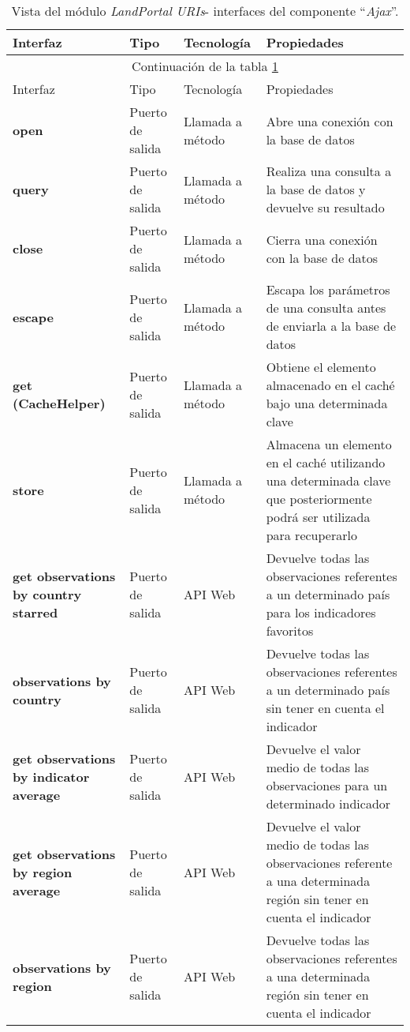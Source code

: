 \begin{longtable}[c]{|p{25mm}|p{20mm}|p{30mm}|p{60mm}|}
	\caption{Vista del módulo \textit{LandPortal URIs}- interfaces del componente ``\textit{Ajax}''. \label{interfaces_landportal_ajax}}\\
		\hline
			Interfaz & Tipo & Tecnología & Propiedades\\
		\hline
		\hline
	\endfirsthead
		\hline
		\multicolumn{4}{|c|}{Continuación de la tabla \ref{interfaces_landportal_ajax}}\\
		\hline
			Interfaz & Tipo & Tecnología & Propiedades\\
		\hline
		\hline
	\endhead
	\hline
	\endfoot
		\textbf{open} & Puerto de salida & Llamada a método & Abre una conexión con la base de datos \\
		\hline
		\textbf{query} & Puerto de salida & Llamada a método & Realiza una consulta a la base de datos y devuelve su resultado \\
		\hline
		\textbf{close} & Puerto de salida & Llamada a método & Cierra una conexión con la base de datos \\
		\hline
		\textbf{escape} & Puerto de salida & Llamada a método & Escapa los parámetros de una consulta antes de enviarla a la base de datos \\
		\hline
		\textbf{get (CacheHelper)} & Puerto de salida & Llamada a método & Obtiene el elemento almacenado en el caché bajo una determinada clave \\
		\hline
		\textbf{store} & Puerto de salida & Llamada a método & Almacena un elemento en el caché utilizando una determinada clave que posteriormente podrá ser utilizada para recuperarlo \\
		\hline
		\textbf{get observations by country starred} & Puerto de salida & API Web & Devuelve todas las observaciones referentes a un determinado país para los indicadores favoritos \\
		\hline
		\textbf{observations by country} & Puerto de salida & API Web & Devuelve todas las observaciones referentes a un determinado país sin tener en cuenta el indicador \\
		\hline
		\textbf{get observations by indicator average} & Puerto de salida & API Web & Devuelve el valor medio de todas las observaciones para un determinado indicador \\
		\hline
		\textbf{get observations by region average} & Puerto de salida & API Web & Devuelve el valor medio de todas las observaciones referente a una determinada región sin tener en cuenta el indicador \\
		\hline
		\textbf{observations by region} & Puerto de salida & API Web & Devuelve todas las observaciones referentes a una determinada región sin tener en cuenta el indicador \\
		\hline
	\hline
	\hline
\end{longtable}